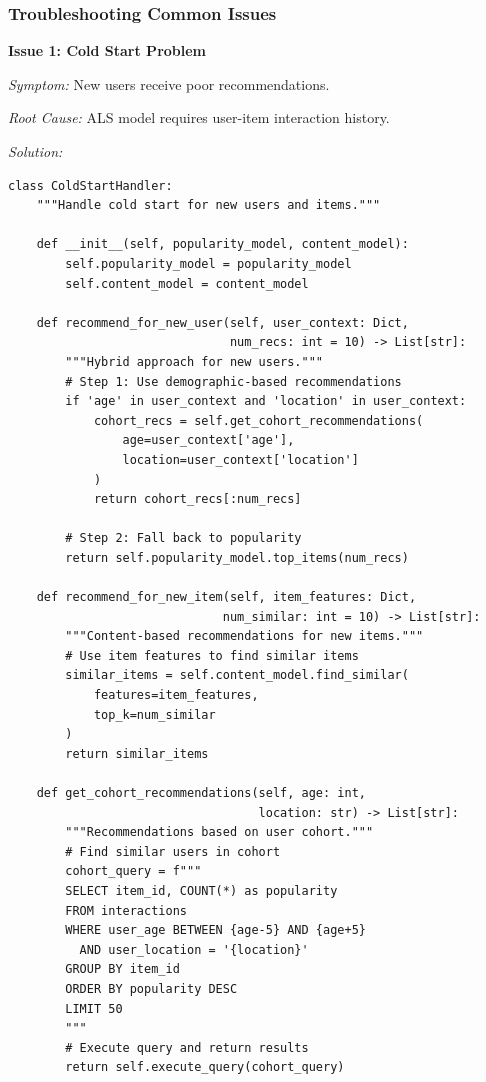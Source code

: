 \subsubsection*{Troubleshooting Common Issues}

\textbf{Issue 1: Cold Start Problem}

\textit{Symptom:} New users receive poor recommendations.

\textit{Root Cause:} ALS model requires user-item interaction history.

\textit{Solution:}
\begin{lstlisting}[style=python]
class ColdStartHandler:
    """Handle cold start for new users and items."""

    def __init__(self, popularity_model, content_model):
        self.popularity_model = popularity_model
        self.content_model = content_model

    def recommend_for_new_user(self, user_context: Dict,
                               num_recs: int = 10) -> List[str]:
        """Hybrid approach for new users."""
        # Step 1: Use demographic-based recommendations
        if 'age' in user_context and 'location' in user_context:
            cohort_recs = self.get_cohort_recommendations(
                age=user_context['age'],
                location=user_context['location']
            )
            return cohort_recs[:num_recs]

        # Step 2: Fall back to popularity
        return self.popularity_model.top_items(num_recs)

    def recommend_for_new_item(self, item_features: Dict,
                              num_similar: int = 10) -> List[str]:
        """Content-based recommendations for new items."""
        # Use item features to find similar items
        similar_items = self.content_model.find_similar(
            features=item_features,
            top_k=num_similar
        )
        return similar_items

    def get_cohort_recommendations(self, age: int,
                                   location: str) -> List[str]:
        """Recommendations based on user cohort."""
        # Find similar users in cohort
        cohort_query = f"""
        SELECT item_id, COUNT(*) as popularity
        FROM interactions
        WHERE user_age BETWEEN {age-5} AND {age+5}
          AND user_location = '{location}'
        GROUP BY item_id
        ORDER BY popularity DESC
        LIMIT 50
        """
        # Execute query and return results
        return self.execute_query(cohort_query)
\end{lstlisting}

